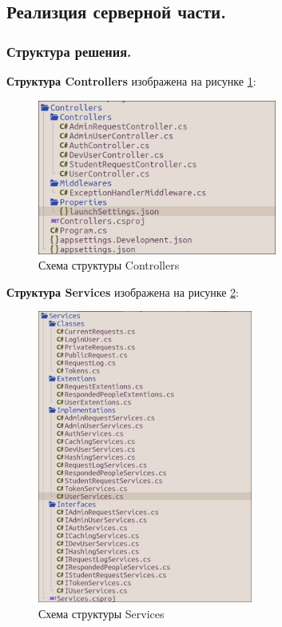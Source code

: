 \subsection{Реализция серверной части.}

\subsubsection{Структура решения.}

\textbf{Структура Controllers} изображена на рисунке \ref{fig:Controllers}:
\begin{figure}[!h]
    \centering
    \includegraphics[width = 0.7\textwidth]{imgs/Controllers.png}
    \caption{Схема структуры Controllers}
    \label{fig:Controllers}
\end{figure}

\textbf{Структура Services} изображена на рисунке \ref{fig:Services}:
\newpage
\begin{figure}[!h]
    \centering
    \includegraphics[width = 0.63\textwidth]{imgs/Services.png}
    \caption{Схема структуры Services}
    \label{fig:Services}
\end{figure}

